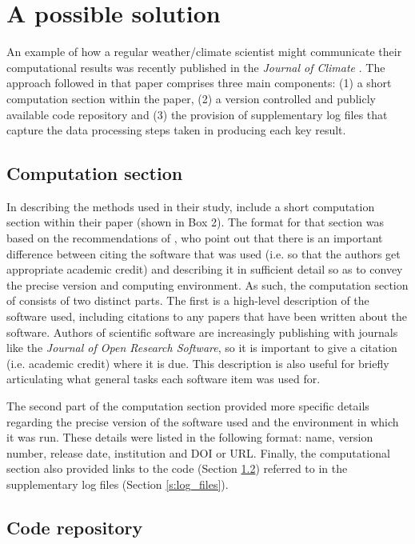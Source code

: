 \section{A possible solution}

An example of how a regular weather/climate scientist might communicate their computational results was recently published in the \textit{Journal of Climate} \citep{Irving2015}. The approach followed in that paper comprises three main components: (1) a short computation section within the paper, (2) a version controlled and publicly available code repository and (3) the provision of supplementary log files that capture the data processing steps taken in producing each key result. 

\subsection{Computation section}

In describing the methods used in their study, \citet{Irving2015} include a short computation section within their paper (shown in Box 2). The format for that section was based on the recommendations of \citet{Jackson2012}, who point out that there is an important difference between citing the software that was used (i.e. so that the authors get appropriate academic credit) and describing it in sufficient detail so as to convey the precise  version and computing environment. As such, the computation section of \citet{Irving2015} consists of two distinct parts. The first is a high-level description of the software used, including citations to any papers that have been written about the software. Authors of scientific software are increasingly publishing with journals like the \textit{Journal of Open Research Software}, so it is important to give a citation (i.e. academic credit) where it is due. This description is also useful for briefly articulating what general tasks each software item was used for.

The second part of the computation section provided more specific details regarding the precise version of the software used and the environment in which it was run. These details were listed in the following format: name, version number, release date, institution and DOI or URL. Finally, the computational section also provided links to the code (Section \ref{s:code_repo}) referred to in the supplementary log files (Section \ref{s:log_files}).  

\subsection{Code repository}\label{s:code_repo}

